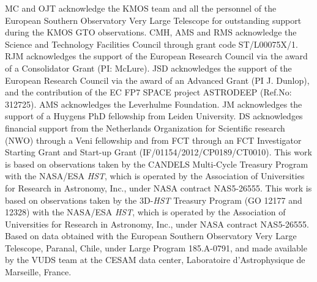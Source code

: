 \documentclass[fleqn,usenatbib]{mnras}
\begin{document}
MC and OJT acknowledge the KMOS team and all the personnel of the European Southern Observatory Very Large Telescope for outstanding support during the KMOS GTO observations.
CMH, AMS and RMS acknowledge the Science and Technology Facilities Council through grant code ST/L00075X/1.
RJM acknowledges the support of the European Research Council via the award of a Consolidator Grant (PI: McLure).
JSD acknowledges the support of the European Research Council via the award of an Advanced Grant (PI J. Dunlop), and the contribution of the EC FP7 SPACE project ASTRODEEP (Ref.No: 312725).
AMS acknowledges the Leverhulme Foundation.
JM acknowledges the support of a Huygens PhD fellowship from Leiden University. DS acknowledges financial support from the Netherlands Organization for Scientific research (NWO) through a Veni fellowship and from FCT through an FCT Investigator Starting Grant and Start-up Grant (IF/01154/2012/CP0189/CT0010).
This work is based on observations taken by the CANDELS Multi-Cycle Treasury Program with the NASA/ESA {\em HST}, which is operated by the Association of Universities for Research in Astronomy, Inc., under NASA contract NAS5-26555.
This work is based on observations taken by the 3D-{\em HST} Treasury Program (GO 12177 and 12328) with the NASA/ESA {\em HST}, which is operated by the Association of Universities for Research in Astronomy, Inc., under NASA contract NAS5-26555.
Based on data obtained with the European Southern Observatory Very Large Telescope, Paranal, Chile, under Large Program 185.A-0791, and made available by the VUDS team at the CESAM data center, Laboratoire d'Astrophysique de Marseille, France.





%


\clearpage 

%

\clearpage


\end{document}
